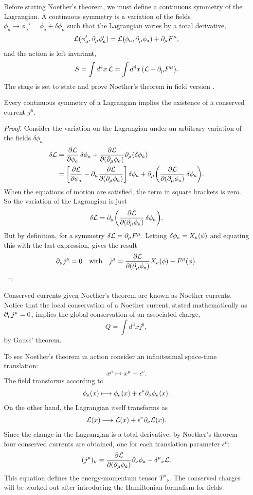 Before stating Noether's theorem, we must define a continuous symmetry of the Lagrangian. A continuous symmetry is a variation of the fields $\phi_a\rightarrow \phi_a'= \phi_a+\delta\phi_a$ such that the Lagrangian varies by a total derivative, $$\mathcal{L}(\phi_a',\dcov \phi_a')=\mathcal{L}(\phi_a,\dcov\phi_a)+\dcov F^\mu,$$ and the action is left invariant, $$S=\int\dd{^4x}\mathcal{L}=\int\dd{^4x}\qty(\mathcal{L}+\dcov F^\mu).$$
The stage is set to state and prove Noether's theorem in field version \cite{peskin_introduction_1995}.
\begin{thm}
Every continuous symmetry of a Lagrangian implies the existence of a conserved current $j^{\mu}$.
\end{thm}
\begin{proof}
Consider the variation on the Lagrangian under an arbitrary variation of the fields $\delta\phi_a$:
\begin{align*}
    \var{\mathcal{L}}&=\pdv{\mathcal{L}}{\phi_a}\var{\phi_a}+\pdv{\mathcal{L}}{(\dcov\phi_a)}\dcov(\var{\phi_a})\\
    &=\qty[\pdv{\lag}{\phi_a}-\dcov\pdv{\lag}{(\dcov\phi_a)}]\var{\phi_a}+\dcov\qty(\pdv{\lag}{(\dcov\phi_a)}\var{\phi_a}).
\end{align*}
When the equations of motion are satisfied, the term in square brackets is zero. So the variation of the Lagrangian is just $$ \var{\lag}=\dcov\qty(\pdv{\lag}{(\dcov\phi_a)}\var{\phi_a}).$$ But by definition, for a symmetry $\var{\lag}=\dcov F^{\mu}$. Letting $\var{\phi_a}=X_a(\phi)$ and equating this with the last expression, gives the result $$\dcov j^\mu = 0\qq{with} j^{\mu}=\pdv{\lag}{(\dcov\phi_a)}X_a(\phi)-F^\mu(\phi).$$
\end{proof}
Conserved currents given Noether's theorem are known as Noether currents. Notice that the local conservation of a Noether current, stated mathematically as $\dcov j^\mu = 0$, implies the global conservation of an associated charge, $$Q = \int d^3 x j^0,$$ by Gauss' theorem.

To see Noether's theorem in action consider an infinitesimal space-time translation: $$x^{\mu} \mapsto x^{\mu}-\epsilon^{\nu}.$$ The field transforms according to $$\phi_a (x) \longmapsto \phi_a(x) + \epsilon^{\nu} \dcov[\nu] \phi_a(x).$$ On the other hand, the Lagrangian itself transforms as $$\lag(x) \longmapsto \lag(x) + \epsilon^{\nu} \dcov[\nu] \lag(x).$$ Since the change in the Lagrangian is a total derivative, by Noether's theorem four conserved currents are obtained, one for each translation parameter $\epsilon^\nu$: $$(j^\mu)_\nu = \pdv{\lag}{(\dcov\phi_a)}\dcov[\nu]\phi_a-{\delta^\mu}_{\nu}\lag.$$ This equation defines the energy-momentum tensor ${T^\mu}_{\nu}$. The conserved charges will be worked out after introducing the Hamiltonian formalism for fields.

